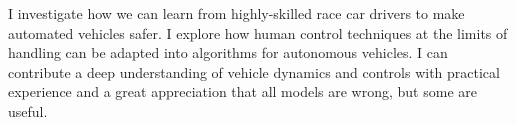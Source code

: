 
\begin{cvparagraph}
I investigate how we can learn from highly-skilled race car drivers to make automated vehicles safer.
I explore how human control techniques at the limits of handling can be adapted into algorithms for autonomous vehicles.
I can contribute a deep understanding of vehicle dynamics and controls with practical experience and a great appreciation that all models are wrong, but some are useful.
\end{cvparagraph}
